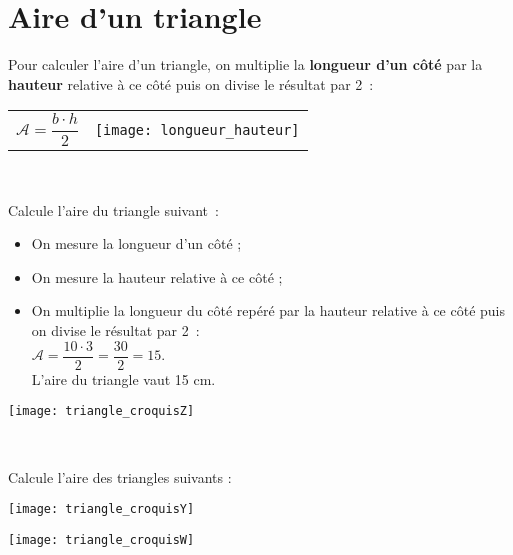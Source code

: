 
\newpage


\section{Aire d'un triangle}

\vspace{2em}

\begin{aconnaitre}
Pour calculer l’aire d’un triangle, on multiplie la \textbf{\textcolor{H1}{longueur d'un côté}} par la \textbf{\textcolor{C2}{hauteur}} relative à ce côté puis on divise le résultat par 2 :

\begin{tabularx}{\textwidth}{XX}
{\large $\mathcal{A} = \dfrac{b \cdot h}{2}$} & \texttt{[image: longueur\_hauteur]} \\
 \end{tabularx} \\
 \end{aconnaitre}

\vspace{4em}

\begin{methode*1}


 
\begin{exemple*1}
Calcule l’aire du triangle suivant :
\begin{minipage}[c]{0.68\textwidth}
\begin{itemize}
 \item On mesure la longueur d'un côté ;
 \item On mesure la hauteur relative à ce côté ;
 \item On multiplie la longueur du côté repéré par la hauteur relative à ce côté puis on divise le résultat par 2 : \\[0.3em]
$\mathcal{A} = \dfrac{10 \cdot 3}{2} = \dfrac{30}{2} = 15$. \\[0.3em]
L'aire du triangle vaut 15 cm.
 \end{itemize}
 \end{minipage} \hfill%
 \begin{minipage}[c]{0.2\textwidth}
 \texttt{[image: triangle\_croquisZ]}
 \end{minipage} \\
\end{exemple*1}


\exercice 
Calcule l’aire des triangles suivants :
\begin{colenumerate}{2}
 \item
 
 \texttt{[image: triangle\_croquisY]}
 \item
 
 \texttt{[image: triangle\_croquisW]}
 \end{colenumerate}

\end{methode*1}

